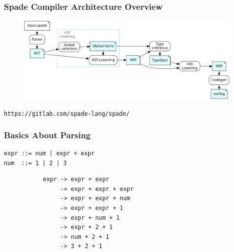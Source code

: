 \documentclass{beamer}
\begin{document}
\begin{frame}[containsverbatim]
\frametitle{Spade Compiler Architecture Overview}
\begin{figure}[h!]
  \includegraphics[width=\textwidth]{figures/architecture.png}
  \label{figArch}
\end{figure}
\footnotesize
\verb"https://gitlab.com/spade-lang/spade/"
\end{frame}

\begin{frame}[containsverbatim]
\frametitle{Basics About Parsing}

\small
\begin{verbatim}
expr ::= num | expr + expr
num  ::= 1 | 2 | 3
\end{verbatim}

\phantom{line}

\begin{figure}[h!]
  \centering
  \begin{subfigure}{.6\textwidth}
\begin{verbatim}
expr -> expr + expr
     -> expr + expr + expr
     -> expr + expr + num
     -> expr + expr + 1
     -> expr + num + 1
     -> expr + 2 + 1
     -> num + 2 + 1
     -> 3 + 2 + 1
\end{verbatim}
  \end{subfigure}%
  \begin{subfigure}{.4\textwidth}
  \end{subfigure}
\end{figure}

\end{frame}
\end{document}
